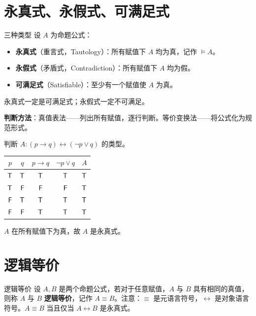 \section{永真式、永假式、可满足式}

\begin{mydefinition}{三种类型}
设 $A$ 为命题公式：
\begin{itemize}
\item \textbf{永真式}（重言式，Tautology）：所有赋值下 $A$ 均为真，记作 $\models A$。
\item \textbf{永假式}（矛盾式，Contradiction）：所有赋值下 $A$ 均为假。
\item \textbf{可满足式}（Satisfiable）：至少有一个赋值使 $A$ 为真。
\end{itemize}
永真式一定是可满足式；永假式一定不可满足。
\end{mydefinition}

\textbf{判断方法}：真值表法——列出所有赋值，逐行判断。等价变换法——将公式化为规范形式。

\begin{example}
判断 $A: (p \rightarrow q) \leftrightarrow (\neg p \lor q)$ 的类型。

\begin{center}
\begin{tabular}{cc|c|c|c}
\toprule
$p$ & $q$ & $p \rightarrow q$ & $\neg p \lor q$ & $A$ \\
\midrule
$\mathsf{T}$ & $\mathsf{T}$ & $\mathsf{T}$ & $\mathsf{T}$ & $\mathsf{T}$ \\
$\mathsf{T}$ & $\mathsf{F}$ & $\mathsf{F}$ & $\mathsf{F}$ & $\mathsf{T}$ \\
$\mathsf{F}$ & $\mathsf{T}$ & $\mathsf{T}$ & $\mathsf{T}$ & $\mathsf{T}$ \\
$\mathsf{F}$ & $\mathsf{F}$ & $\mathsf{T}$ & $\mathsf{T}$ & $\mathsf{T}$ \\
\bottomrule
\end{tabular}
\end{center}
$A$ 在所有赋值下为真，故 $A$ 是永真式。
\end{example}

\section{逻辑等价}

\begin{mydefinition}{逻辑等价}
设 $A,B$ 是两个命题公式，若对于任意赋值，$A$ 与 $B$ 具有相同的真值，则称 $A$ 与 $B$ \textbf{逻辑等价}，记作 $A \equiv B$。注意：$\equiv$ 是元语言符号，$\leftrightarrow$ 是对象语言符号。$A \equiv B$ 当且仅当 $A \leftrightarrow B$ 是永真式。
\end{mydefinition}


